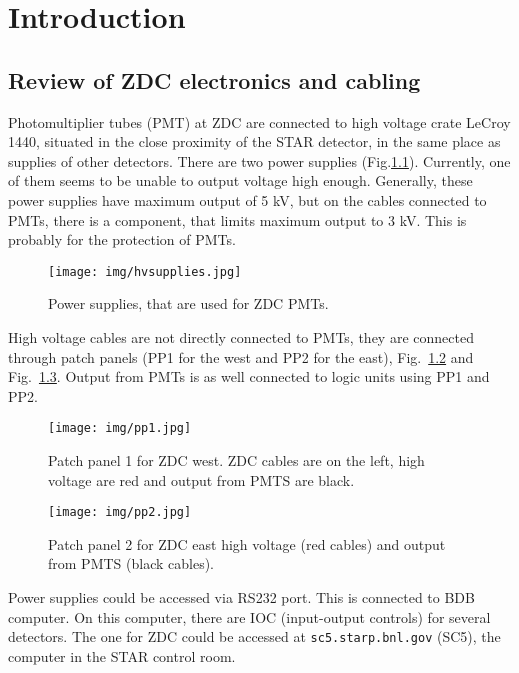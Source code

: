\chapter{Introduction}
\section{Review of ZDC electronics and cabling}
Photomultiplier tubes (PMT) at ZDC are connected to high voltage crate LeCroy 1440, situated in the close proximity of the STAR detector, in the same place as supplies of other detectors. There are two power supplies (Fig.\ref{hvsupplies}). Currently, one of them seems to be unable to output voltage high enough. Generally, these power supplies have maximum output of 5 kV, but on the cables connected to PMTs, there is a component, that limits maximum output to 3 kV. This is probably for the protection of PMTs.

\begin{figure}[htb]
\begin{center}
\texttt{[image: img/hvsupplies.jpg]}
\end{center}
\caption{Power supplies, that are used for ZDC PMTs.}
\label{hvsupplies}
\end{figure}

High voltage cables are not directly connected to PMTs, they are connected through patch panels (PP1 for the west and PP2 for the east), Fig.~\ref{pp1} and Fig.~\ref{pp2}. Output from PMTs is as well connected to logic units using PP1 and PP2.

\begin{figure}[htb]
\begin{center}
\texttt{[image: img/pp1.jpg]}
\end{center}
\caption{Patch panel 1 for ZDC west.  ZDC cables are on the left, high voltage are red and output from PMTS are black.}
\label{pp1}
\end{figure}

\begin{figure}[htb]
\begin{center}
\texttt{[image: img/pp2.jpg]}
\end{center}
\caption{Patch panel 2 for ZDC east high voltage (red cables) and output from PMTS (black cables).}
\label{pp2}
\end{figure}

Power supplies could be accessed via RS232 port. This is connected to BDB computer. On this computer, there are IOC (input-output controls) for several detectors. The one for ZDC could be accessed at \texttt{sc5.starp.bnl.gov} (SC5), the computer in the STAR control room.

